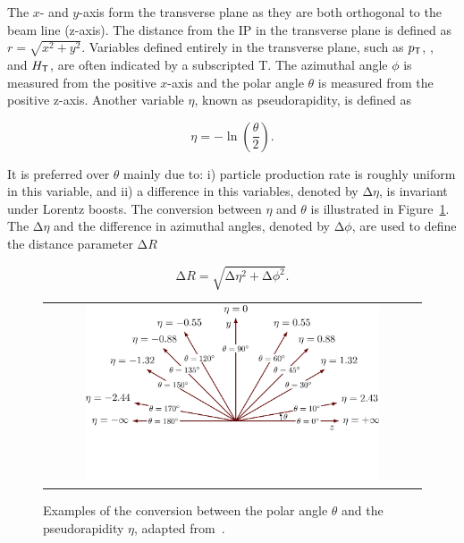 The $x$- and $y$-axis form the transverse plane as they are both orthogonal to the beam line (z-axis). The distance from the \ac{IP} in the transverse plane is defined as $r=\sqrt{x^2+y^2}$. Variables defined entirely in the transverse plane, such as $p_{\textsf{T}}$, \MET, and $H_{\textsf{T}}$, are often indicated by a subscripted T. The azimuthal angle $\phi$ is measured from the positive $x$-axis and the polar angle $\theta$ is measured from the positive z-axis. Another variable $\eta$, known as pseudorapidity, is defined as

\begin{equation}
\eta=-\ln(\frac{\theta}{2}).
\end{equation}

It is preferred over $\theta$ mainly due to: i) particle production rate is roughly uniform in this variable, and ii) a difference in this variables, denoted by $\mathrm{\Delta}\eta$, is invariant under Lorentz boosts. The conversion between $\eta$ and $\theta$ is illustrated in Figure~\ref{fig:axis2D}. The $\mathrm{\Delta}\eta$ and the difference in azimuthal angles, denoted by $\mathrm{\Delta}\phi$, are used to define the distance parameter $\mathrm{\Delta}R$

\begin{equation}
\label{eq:DR}
\mathrm{\Delta}R=\sqrt{\mathrm{\Delta}\eta^2+\mathrm{\Delta}\phi^2}.
\end{equation}

\begin{figure}[tbh!]
 \begin{center}
 \begin{tabular}{c}
 \includegraphics[width=0.8\textwidth]{figures/Part2/CMS/axis2D_pseudorapidity-003}
 \end{tabular}
 \caption{Examples of the conversion between the polar angle $\theta$ and the pseudorapidity $\eta$, adapted from~\cite{tikz:2D}.}
 \label{fig:axis2D}
 \end{center}
\end{figure}

